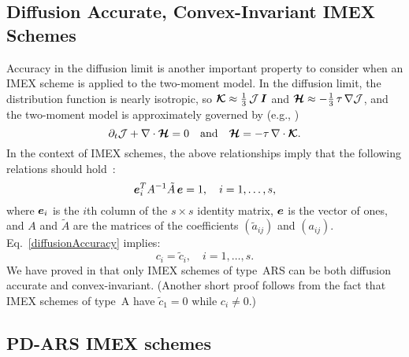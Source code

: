 \subsection{Diffusion Accurate, Convex-Invariant IMEX Schemes}

Accuracy in the diffusion limit is another important property to consider when an IMEX scheme is applied to the two-moment model.  
In the diffusion limit, the distribution function is nearly isotropic, so $\boldsymbol{\mathcal{K}}\approx\frac{1}{3}\,\mathcal{J}\,\boldsymbol{I}$ and $\boldsymbol{\mathcal{H}}\approx-\frac{1}{3}\,\tau\,\nabla\mathcal{J}$, and the two-moment model is approximately governed by (e.g., \cite{jinLevermore_1996})
\begin{equation}
  \partial_{t}{\mathcal{J}} + \nabla\cdot\boldsymbol{\mathcal{H}} = 0
  \quad\text{and}\quad
  \boldsymbol{\mathcal{H}} = - \tau\,\nabla\cdot\boldsymbol{\mathcal{K}}.  
  \label{eq:diffusionLimit}
\end{equation}
In the context of IMEX schemes, the above relationships imply that the following relations should hold~\cite{chu_etal_2018}:
\begin{equation}
   \boldsymbol{e}_{i}^{T}A^{-1}\tilde{A}\,\boldsymbol{e} = 1, \quad i=1,\ldots,s,
   \label{diffusionAccuracy}
\end{equation}
where $\boldsymbol{e}_{i}$ is the $i$th column of the $s\times s$ identity matrix, $\boldsymbol{e}$ is the vector of ones, and $A$ and $\tilde{A}$ are the matrices of the coefficients $(\tilde{a}_{ij})$ and $(a_{ij})$.
Eq.~\eqref{diffusionAccuracy} implies:
\begin{equation}
  c_{i} = \tilde{c}_{i}, \quad i=1,\ldots,s.
\end{equation}
We have proved in \cite{chu_etal_2018} that only IMEX schemes of type~ARS can be both diffusion accurate and convex-invariant.  
(Another short proof follows from the fact that IMEX schemes of type~A have $\tilde{c}_1 = 0$ while $c_i \neq 0$.)  

\subsection{PD-ARS IMEX schemes}

